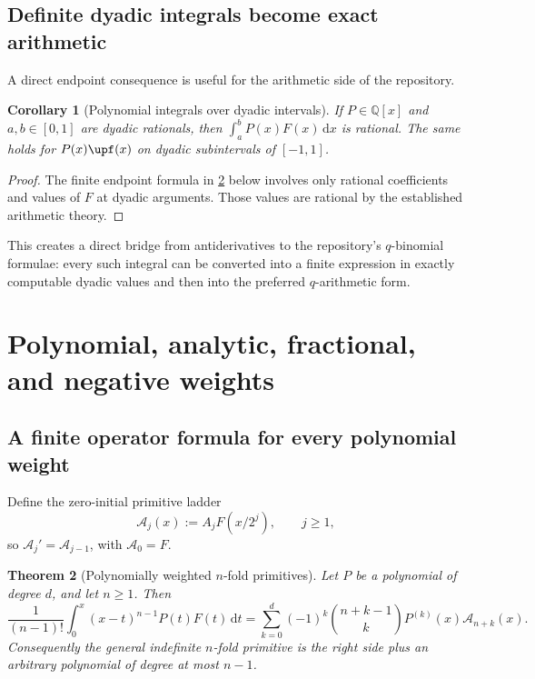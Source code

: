 \documentclass[11pt,oneside]{article}
\newtheorem{theorem}{Theorem}[section]
\newtheorem{corollary}[theorem]{Corollary}
\theoremstyle{definition}
\theoremstyle{remark}
\newcommand{\dd}{\,\mathrm d}
\newcommand{\1}{\mathbf 1}
\begin{document}
\subsection{Definite dyadic integrals become exact arithmetic}

A direct endpoint consequence is useful for the arithmetic side of the repository.

\begin{corollary}[Polynomial integrals over dyadic intervals]
If \(P\in\mathbb Q[x]\) and \(a,b\in[0,1]\) are dyadic rationals, then
\(
 \int_a^bP(x)F(x)\dd x
\)
is rational.  The same holds for \(P(x)\upf(x)\) on dyadic subintervals of
\([-1,1]\).
\end{corollary}

\begin{proof}
The finite endpoint formula in \cref{p6:thm:polynomial-primitive} below involves only
rational coefficients and values of \(F\) at dyadic arguments.  Those values are
rational by the established arithmetic theory.
\end{proof}

This creates a direct bridge from antiderivatives to the repository's
\(q\)-binomial formulae: every such integral can be converted into a finite expression
in exactly computable dyadic values and then into the preferred \(q\)-arithmetic form.

\section{Polynomial, analytic, fractional, and negative weights}

\subsection{A finite operator formula for every polynomial weight}

Define the zero-initial primitive ladder
\begin{equation}
 \mathcal A_j(x):=A_jF(x/2^j),\qquad j\ge1,                \label{p6:eq:Aj-ladder}
\end{equation}
so \(\mathcal A_j'=\mathcal A_{j-1}\), with
\(\mathcal A_0=F\).

\begin{theorem}[Polynomially weighted \(n\)-fold primitives]
\label{p6:thm:polynomial-primitive}
Let \(P\) be a polynomial of degree \(d\), and let \(n\ge1\).  Then
\begin{equation}
 \boxed{
 \frac1{(n-1)!}\int_0^x(x-t)^{n-1}P(t)F(t)\dd t
 =\sum_{k=0}^{d}(-1)^k\binom{n+k-1}{k}
   P^{(k)}(x)\mathcal A_{n+k}(x).
 }                                                        \label{p6:eq:poly-nfold}
\end{equation}
Consequently the general indefinite \(n\)-fold primitive is the right side plus an
arbitrary polynomial of degree at most \(n-1\).
\end{theorem}
\end{document}
